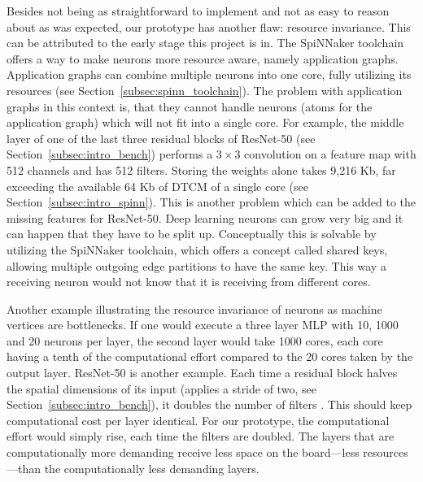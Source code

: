 \documentclass[]{article}
\begin{document}
Besides not being as straightforward to implement and not as easy to
reason about as was expected, our prototype has another flaw: resource
invariance.
This can be attributed to the early stage this project is in.
The SpiNNaker toolchain offers a way to make neurons more resource
aware, namely application graphs.
Application graphs can combine multiple neurons
into one core, fully utilizing its resources (see
Section~\ref{subsec:spinn_toolchain}).
The problem with application graphs in this context is, that they
cannot handle neurons (atoms for the application graph) which will
not fit into a single core.
For example, the middle layer of one of the last three residual blocks
of ResNet-50 (see Section~\ref{subsec:intro_bench}) performs a
$3 \times 3$ convolution on a feature map with 512 channels and
has 512 filters.
Storing the weights alone takes 9,216 Kb, far exceeding the available
64 Kb of DTCM of a single core (see Section~\ref{subsec:intro_spinn}).
This is another problem which can be added to the missing features
for ResNet-50.
Deep learning neurons can grow very big and it can happen that they
have to be split up.
Conceptually this is solvable by utilizing the SpiNNaker toolchain,
which offers a concept called shared keys, allowing multiple outgoing
edge partitions to have the same key.
This way a receiving neuron would not know that it is receiving from
different cores.

Another example illustrating the resource invariance of neurons as
machine vertices are bottlenecks.
If one would execute a three layer MLP with 10, 1000 and 20 neurons
per layer, the second layer would take 1000 cores, each core having
a tenth of the computational effort compared to the 20 cores taken
by the output layer.
ResNet-50 is another example.
Each time a residual block halves the spatial dimensions of its
input (applies a stride of two, see Section~\ref{subsec:intro_bench}),
it doubles the number of filters \citep{he_et_al_2015}.
This should keep computational cost per layer identical.
For our prototype, the computational effort would simply rise, each
time the filters are doubled.
The layers that are computationally more demanding receive less space
on the board---less resources---than the computationally less
demanding layers.
\end{document}
